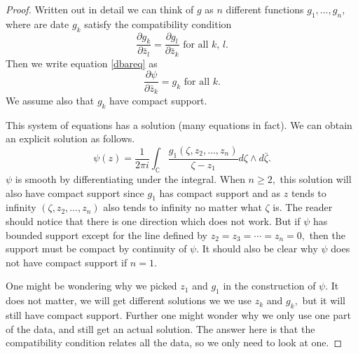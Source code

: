 \documentclass[12pt]{article}
\theoremstyle{theorem}
\theoremstyle{definition}
\theoremstyle{remark}
\begin{document}
\begin{proof}
Written out in detail we can think of $g$ as $n$ different functions
$g_1,\ldots,g_n,$
where are date $g_k$ satisfy the compatibility condition
\begin{equation*}
\frac{\partial g_k}{\partial \bar{z}_l} =
\frac{\partial g_l}{\partial \bar{z}_k} \text{ for all $k$, $l$}.
\end{equation*}
Then we write equation \eqref{dbareq} as
\begin{equation*}
\frac{\partial \psi}{\partial \bar{z}_k} = g_k \text{ for all $k$.}
\end{equation*}
We assume also that $g_k$ have compact support.

This system of equations has a solution (many equations in fact).  We can
obtain an explicit solution as follows.
\begin{equation*}
\psi(z)
=
\frac{1}{2\pi i}
\int_{\mathbb C}
\frac{
 g_1(\zeta,z_2,\ldots,z_n)
}{\zeta - z_1}
d\zeta \wedge d\bar{\zeta} .
\end{equation*}
$\psi$ is smooth by differentiating under the integral.
When $n \geq 2,$
this solution will also have compact support since $g_1$
has compact support and as $z$
tends to infinity $(\zeta,z_2,\ldots,z_n)$ also tends to infinity
no matter what $\zeta$ is.  The reader should notice that there is one
direction which does not work.  But if $\psi$ has bounded support
except for the line defined by $z_2 = z_3 = \cdots = z_n = 0,$ then 
the support must be compact by continuity of $\psi$.
It
should also be clear why $\psi$ does not have compact support
if $n=1.$

One might be wondering why
we picked $z_1$ and $g_1$ in the construction of $\psi.$  It does not matter,
we will get different solutions we we use $z_k$ and $g_k,$ but it will
still have compact support.
Further one might wonder why we only
use one part of the data, and still get an actual solution.
The answer here is that the compatibility condition relates all the data,
so we only need to look at one.



\end{proof}
\end{document}

